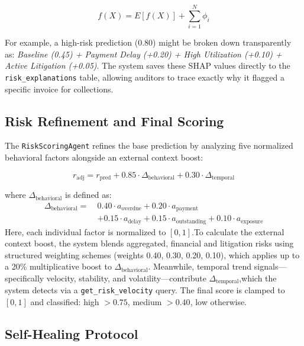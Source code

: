 ﻿\documentclass[runningheads]{llncs}
\begin{document}
\begin{equation}
f(X) = E[f(X)] + \sum_{i=1}^{N} \phi_i
\label{eq:shap}
\end{equation}

For example, a high-risk prediction ($0.80$) might be broken down transparently as: \textit{Baseline (0.45) + Payment Delay (+0.20) + High Utilization (+0.10) + Active Litigation (+0.05)}. The system saves these SHAP values directly to the \texttt{risk\allowbreak \_explanations} table, allowing auditors to trace exactly why it flagged a specific invoice for collections.

\subsection{Risk Refinement and Final Scoring}

The \texttt{RiskScoringAgent} refines the base prediction by analyzing five normalized behavioral factors alongside an external context boost:

\begin{equation}
r_{\text{adj}} = r_{\text{pred}} + 0.85\cdot\Delta_{\text{behavioral}} + 0.30\cdot\Delta_{\text{temporal}}
\label{eq:refinement}
\end{equation}

where $\Delta_{\text{behavioral}}$ is defined as:
\begin{equation}
\begin{split}
\Delta_{\text{behavioral}} =\ &0.40\cdot a_{\text{overdue}} + 0.20\cdot a_{\text{payment}} \\
&+ 0.15\cdot a_{\text{delay}} + 0.15\cdot a_{\text{outstanding}} + 0.10\cdot a_{\text{exposure}}
\end{split}
\end{equation}
Here, each individual factor is normalized to $[0,1]$.To calculate the external context boost, the system blends aggregated, financial and litigation risks using structured weighting schemes (weights 0.40, 0.30, 0.20, 0.10), which applies up to a 20\% multiplicative boost to $\Delta_{\text{behavioral}}$. Meanwhile, temporal trend signals—specifically velocity, stability, and volatility—contribute $\Delta_{\text{temporal}}$,which the system detects via a \texttt{get\_risk\_velocity} query. The final score is clamped to $[0,1]$ and classified: high $>0.75$, medium $>0.40$, low otherwise.

\subsection{Self-Healing Protocol}
\end{document}
